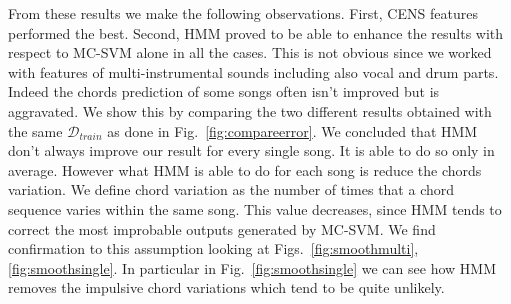 %
From these results we make the following observations. First, CENS features performed the best. Second, HMM proved to be able to enhance the results with respect to MC-SVM alone in all the cases. This is not obvious since we worked with features of multi-instrumental sounds including also vocal and drum parts. Indeed the chords prediction of some songs often isn't improved but is aggravated. We show this by comparing the two different results obtained with the same $\mathcal{D}_{train}$ as done in Fig.~\ref{fig:compareerror}.
%
We concluded that HMM don't always improve our result for every single song. It is able to do so only in average. However what HMM is able to do for each song is reduce the chords variation. We define chord variation as the number of times that a chord sequence varies within the same song. This value decreases, since HMM tends to correct the most improbable outputs generated by MC-SVM. We find confirmation to this assumption looking at Figs.~\ref{fig:smoothmulti},\ref{fig:smoothsingle}. In particular in Fig.~\ref{fig:smoothsingle} we can see how HMM removes the impulsive chord variations which tend to be quite unlikely.